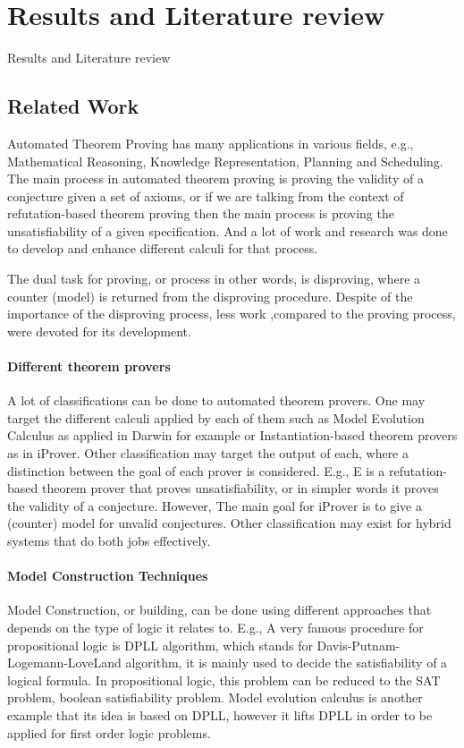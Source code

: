 \chapter{Results and Literature review}\label{chap:res_and_lit}
Results and Literature review

\section{Related Work}
Automated Theorem Proving has many applications in various fields, e.g., Mathematical Reasoning, Knowledge Representation, Planning and Scheduling. The main process in automated theorem proving is proving the validity of a conjecture given a set of axioms, or if we are talking from the context of refutation-based theorem proving then the main process is proving the unsatisfiability of a given specification. And a lot of work and research was done to develop and enhance different calculi for that process.  


The dual task for proving, or process in other words, is disproving, where a counter (model) is returned from the disproving procedure. Despite of the importance of the disproving process, less work ,compared to the proving process, were devoted for its development.

\subsubsection{Different theorem provers}
A lot of classifications can be done to automated theorem provers. One may target the different calculi applied by each of them such as Model Evolution Calculus as applied in Darwin for example or Instantiation-based theorem provers as in iProver. Other classification may target the output of each, where a distinction between the goal of each prover is considered. E.g., E is a refutation-based theorem prover that proves unsatisfiability, or in simpler words it proves the validity of a conjecture. However, The main goal for iProver is to give a (counter) model for unvalid conjectures. Other classification may exist for hybrid systems that do both jobs effectively.


\subsubsection{Model Construction Techniques}
Model Construction, or building, can be done using different approaches that depends on the type of logic it relates to. E.g., A very famous procedure for propositional logic is DPLL algorithm, which stands for Davis-Putnam-Logemann-LoveLand algorithm, it is mainly used to decide the satisfiability of a logical formula. In propositional logic, this problem can be reduced to the SAT problem, boolean satisfiability problem. Model evolution calculus is another example that its idea is based on DPLL, however it lifts DPLL in order to be applied for first order logic problems.



